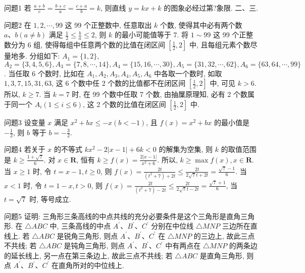 
问题1 若 $\frac{a+b}{c}=\frac{b+c}{a}=\frac{c+a}{b}=k$, 则直线 $y=k x+k$ 的图象必经过第?象限.
二、三.



问题2 在 $1,2, \cdots, 99$ 这 99 个正整数中, 任意取出 $k$ 个数, 使得其中必有两个数 $a 、 b(a \neq b)$ 满足 $\frac{1}{2} \leqslant \frac{b}{a} \leqslant 2$, 则 $k$ 的最小可能值等于
$7$. 将 $1 \sim 99$ 这 99 个正整数分为 6 组, 使得每组中任意两个数的比值在闭区间 $\left[\frac{1}{2}, 2\right]$ 中, 且每组元素个数尽量地多.
分组如下: $A_1=\{1,2\}$, $A_2=\{3,4,5,6\}, A_3=\{7,8, \cdots, 14\}, A_4=\{15,16, \cdots, 30\}, A_5=\{31, 32, \cdots, 62\}, A_6=\{63,64, \cdots, 99\}$. 当任取 6 个数时, 比如在 $A_1, A_2, A_3, A_4, A_5, A_6$ 中各取一个数时, 如取 $1,3,7,15,31,63$, 这 6 个数中任 2 个数的比值都不在闭区间 $\left[\frac{1}{2}, 2\right]$ 中, 可见 $k>6$. 所以, $k \geqslant 7$.
当 $k=7$ 时, 在 99 个数中任取 7 个数, 由抽屟原理知, 必有 2 个数属于同一个 $A_i(1 \leqslant i \leqslant 6)$, 这 2 个数的比值在闭区间 $\left[\frac{1}{2}, 2\right]$ 中.



问题3 设变量 $x$ 满足 $x^2+b x \leqslant-x(b<-1)$, 且 $f(x)=x^2+b x$ 的最小值是 $-\frac{1}{2}$, 则 $b$ 等于
$b=-\frac{3}{2}$.



问题4 若关于 $x$ 的不等式 $k x^2-2|x-1|+6 k<0$ 的解集为空集, 则 $k$ 的取值范围是
$k \geqslant \frac{1+\sqrt{7}}{6}$. 对 $x \in \mathbf{R}$, 恒有 $k \geqslant f(x)=\frac{2|x-1|}{x^2+6}$. 所以, $k \geqslant \max f(x), x \in \mathbf{R}$. 当 $x \geqslant 1$ 时, 令 $t=x-1, t \geqslant 0$, 则 $f(x)=\frac{2 t}{\left(t^2+7\right)+2 t} \leqslant \frac{2 t}{2 \sqrt{7} t+2 t}=\frac{\sqrt{7}-1}{6}$. 当 $x<1$ 时, 令 $t=1-x, t>0$, 则 $f(x)=\frac{2 t}{\left(t^2+7\right)-2 t} \leqslant \frac{2 t}{2 \sqrt{7} t-2 t}=\frac{\sqrt{7}+1}{6}$, 当 $t=\sqrt{7}$ 时, 等号成立.



问题5 证明: 三角形三条高线的中点共线的充分必要条件是这个三角形是直角三角形.
在 $\triangle A B C$ 中, 三条高线的中点 $A^{\prime} 、 B^{\prime} 、 C^{\prime}$ 分别在中位线 $\triangle M N P$ 三边所在直线上.
若 $\triangle A B C$ 是锐角三角形, 则点 $A^{\prime} 、 B^{\prime} 、 C^{\prime}$ 在 $\triangle M N P$ 的三边上, 故此三点不共线; 若 $\triangle A B C$ 是钝角三角形, 则点 $A^{\prime} 、 B^{\prime} 、 C^{\prime}$ 中有两点在 $\triangle M N P$ 的两条边的延长线上, 另一点在第三条边上, 故此三点不共线; 若 $\triangle A B C$ 是直角三角形, 则点 $A^{\prime} 、 B^{\prime} 、 C^{\prime}$ 在直角所对的中位线上.



